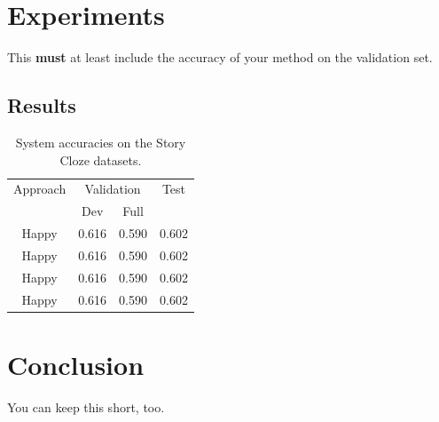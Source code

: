 \documentclass{article}
\begin{document}
\section{Experiments}
This {\bf must} at least include the accuracy of your method on the validation set.

\subsection{Results}
\begin{table}[h]
  \centering
  \begin{tabular}{ c c c c}
    \toprule
    Approach &  \multicolumn{2}{c}{Validation} & Test \\
     &  Dev & Full &  \\
    \midrule
    Happy & 0.616 & 0.590& 0.602\\
    Happy & 0.616 & 0.590& 0.602\\
    Happy & 0.616 & 0.590& 0.602\\
    Happy & 0.616 & 0.590& 0.602\\

    \bottomrule
  \end{tabular}
  \label{Tab:results}
  \caption{System accuracies on the Story Cloze datasets. }
\end{table}

\section{Conclusion}
You can keep this short, too.





\end{document}
